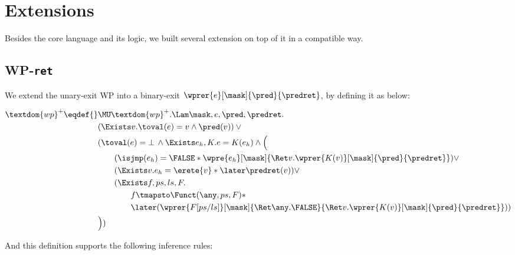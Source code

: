 \section{Extensions}\label{sec:extension}


Besides the core language and its logic,
we built several extension on top of it in a compatible way.

\subsection{WP-\texttt{ret}}\label{def:wpr}

We extend the unary-exit WP into a binary-exit $\wprer{e}[\mask]{\pred}{\predret}$,
by defining it as below:

\begin{align*}
  \textdom{wp}^{+} \eqdef{}& \MU \textdom{wp}^{+}. \Lam \mask, e, \pred, \predret. \\
        & (\Exists v. \toval(e) = v \land \pred(v)) \lor {}\\
        & (\toval(e) = \bot \,\land \Exists e_h, K. e = K(e_h) \land \Bigl({}\\
        &\qquad (\isjmp(e_h) = \FALSE * \wpre{e_h}[\mask]{\Ret v. \wprer{K(v)}[\mask]{\pred}{\predret}}) \lor \\
        &\qquad (\Exists v. e_h = \erete{v} * \later \predret(v)) \lor \\
        &\qquad (\Exists f, ps, ls, F. \\
                           & \qquad \qquad f \tmapsto \Funct(\any, ps, F) * \\
                           & \qquad \qquad \later (\wprer{F[ps/ls]}[\mask]{\Ret\any.\FALSE}{\Ret v.
                             \wprer{K(v)}[\mask]{\pred}{\predret}})) \\
        &\Bigr) )\\
\end{align*}

And this definition supports the following inference rules:

